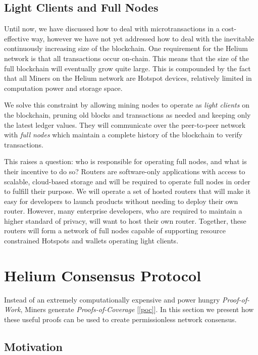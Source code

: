 \documentclass[10pt, nonatbib, nocopyrightspace, reprint]{sigplanconf}
\newcommand{\secref}[1]{[\autoref{#1}]}
\begin{document}
\subsection{Light Clients and Full Nodes} \label{full-nodes}

Until now, we have discussed how to deal with microtransactions in a cost-effective way, however we have not yet addressed how to deal with the inevitable continuously increasing size of the blockchain. One requirement for the Helium network is that all transactions occur on-chain. This means that the size of the full blockchain will eventually grow quite large. This is compounded by the fact that all Miners on the Helium network are Hotspot devices, relatively limited in computation power and storage space.

We solve this constraint by allowing mining nodes to operate as \emph{light clients} on the blockchain, pruning old blocks and transactions as needed and keeping only the latest ledger values. They will communicate over the peer-to-peer network with \emph{full nodes} which maintain a complete history of the blockchain to verify transactions.

This raises a question: who is responsible for operating full nodes, and what is their incentive to do so? Routers are software-only applications with access to scalable, cloud-based storage and will be required to operate full nodes in order to fulfill their purpose. We will operate a set of hosted routers that will make it easy for developers to launch products without needing to deploy their own router. However, many enterprise developers, who are required to maintain a higher standard of privacy, will want to host their own router. Together, these routers will form a network of full nodes capable of supporting resource constrained Hotspots and wallets operating light clients.

\section{Helium Consensus Protocol}\label{consensus}

Instead of an extremely computationally expensive and power hungry \emph{Proof-of-Work}, Miners generate \emph{Proofs-of-Coverage} \secref{poc}. In this section we present how these useful proofs can be used to create permissionless network consensus.

\subsection{Motivation}
\end{document}
